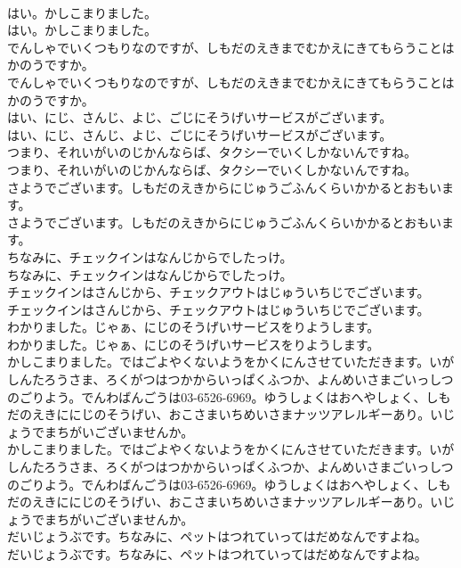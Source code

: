 \documentclass[8pt]{extreport}
\begin{document}
\begin{CJK}{UTF8}{min}
\\	はい。かしこまりました。
\\	はい。かしこまりました。
\\	でんしゃでいくつもりなのですが、しもだのえきまでむかえにきてもらうことはかのうですか。
\\	でんしゃでいくつもりなのですが、しもだのえきまでむかえにきてもらうことはかのうですか。
\\	はい、にじ、さんじ、よじ、ごじにそうげいサービスがございます。
\\	はい、にじ、さんじ、よじ、ごじにそうげいサービスがございます。
\\	つまり、それいがいのじかんならば、タクシーでいくしかないんですね。
\\	つまり、それいがいのじかんならば、タクシーでいくしかないんですね。
\\	さようでございます。しもだのえきからにじゅうごふんくらいかかるとおもいます。
\\	さようでございます。しもだのえきからにじゅうごふんくらいかかるとおもいます。
\\	ちなみに、チェックインはなんじからでしたっけ。
\\	ちなみに、チェックインはなんじからでしたっけ。
\\	チェックインはさんじから、チェックアウトはじゅういちじでございます。
\\	チェックインはさんじから、チェックアウトはじゅういちじでございます。
\\	わかりました。じゃぁ、にじのそうげいサービスをりようします。
\\	わかりました。じゃぁ、にじのそうげいサービスをりようします。
\\	かしこまりました。ではごよやくないようをかくにんさせていただきます。いが　しんたろうさま、ろくがつはつかからいっぱくふつか、よんめいさまごいっしつのごりよう。でんわばんごうは03-6526-6969。ゆうしょくはおへやしょく、しもだのえきににじのそうげい、おこさまいちめいさまナッツアレルギーあり。いじょうでまちがいございませんか。
\\	かしこまりました。ではごよやくないようをかくにんさせていただきます。いが　しんたろうさま、ろくがつはつかからいっぱくふつか、よんめいさまごいっしつのごりよう。でんわばんごうは03-6526-6969。ゆうしょくはおへやしょく、しもだのえきににじのそうげい、おこさまいちめいさまナッツアレルギーあり。いじょうでまちがいございませんか。
\\	だいじょうぶです。ちなみに、ペットはつれていってはだめなんですよね。
\\	だいじょうぶです。ちなみに、ペットはつれていってはだめなんですよね。

\end{CJK}
\end{document}
